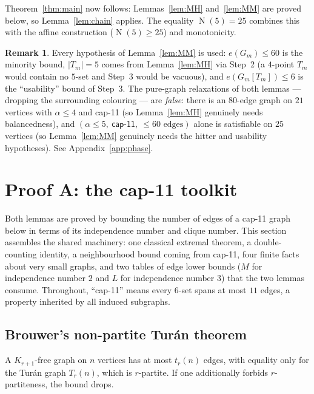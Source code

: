 \documentclass[11pt,reqno]{amsart}
\theoremstyle{definition}
\newtheorem{remark}[theorem]{Remark}
\theoremstyle{remark}
\newcommand{\abs}[1]{\left|#1\right|}
\newcommand{\capeleven}{\textsf{cap-11}}
\DeclareMathOperator{\Ncap}{N}
\begin{document}
Theorem~\ref{thm:main} now follows: Lemmas~\ref{lem:MH} and~\ref{lem:MM} are proved
below, so Lemma~\ref{lem:chain} applies. The equality $\Ncap(5)=25$ combines this
with the affine construction ($\Ncap(5)\ge 25$) and monotonicity.

\begin{remark}
Every hypothesis of Lemma~\ref{lem:MM} is used: $e(G_m)\le 60$ is the minority
bound, $\abs{T_m}=5$ comes from Lemma~\ref{lem:MH} via Step~2 (a $4$-point $T_m$
would contain no $5$-set and Step~3 would be vacuous), and $e(G_m[T_m])\le 6$ is
the ``usability'' bound of Step~3. The pure-graph relaxations of both lemmas ---
dropping the surrounding colouring --- are \emph{false}: there is an $80$-edge graph
on $21$ vertices with $\alpha\le 4$ and \capeleven{} (so Lemma~\ref{lem:MH} genuinely
needs balancedness), and $(\alpha\le 5,\ \capeleven,\ \le 60\text{ edges})$ alone is
satisfiable on $25$ vertices (so Lemma~\ref{lem:MM} genuinely needs the hitter and
usability hypotheses). See Appendix~\ref{app:phase}.
\end{remark}

\section{Proof A: the \texorpdfstring{\capeleven}{cap-11} toolkit}\label{sec:toolkit}

Both lemmas are proved by bounding the number of edges of a \capeleven{} graph
below in terms of its independence number and clique number. This section
assembles the shared machinery: one classical extremal theorem, a double-counting
identity, a neighbourhood bound coming from \capeleven, four finite facts about
very small graphs, and two tables of edge lower bounds ($M$ for independence number
$2$ and $L$ for independence number $3$) that the two lemmas consume. Throughout,
``\capeleven'' means every $6$-set spans at most $11$ edges, a property inherited
by all induced subgraphs.

\subsection{Brouwer's non-partite Tur\'an theorem}
A $K_{r+1}$-free graph on $n$ vertices has at most $t_r(n)$ edges, with equality
only for the Tur\'an graph $T_r(n)$, which is $r$-partite. If one additionally
forbids $r$-partiteness, the bound drops.
\end{document}
